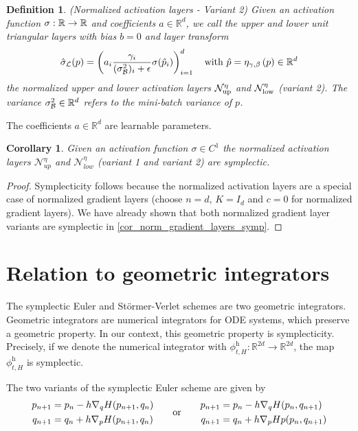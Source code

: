 \documentclass[twoside,a4paper]{article}
\newtheorem{definition}{Definition}
\newtheorem{corollary}{Corollary}
\begin{document}
\begin{definition}
	(Normalized activation layers - Variant 2)
	Given an activation function $\activation : \R \to \R$ and coefficients $a \in \mathbb{R}^d$, 
	we call the upper and lower unit triangular layers with bias $b=0$ and layer transform
	\begin{equation*}
		\layertf(p) = \lb a_i \frac{\gamma_i}{(\sigma^2_\mathcal{B})_i + \epsilon} 
		\activation(\hat{p}_i) \rb_{i=1}^d
		\quad \text{with } \hat{p} = \eta_{\gamma, \beta} \lb p \rb \in \R^d
	\end{equation*}
	the normalized upper and lower activation layers $\mathcal{N}_\up^\eta$ and $\mathcal{N}_\low^\eta$
	(variant 2).
	The variance $\sigma^2_\mathcal{B} \in \R^d$ refers to the mini-batch variance of $p$.
\end{definition}

The coefficients $a \in \mathbb{R}^d$ are learnable parameters.

\begin{corollary}
	Given an activation function $\sigma \in C^1$
	the normalized activation layers $\mathcal{N}^{\eta}_{up}$ and $\mathcal{N}^{\eta}_{low}$
	(variant 1 and variant 2) are symplectic.
\end{corollary}
\begin{proof}
	Symplecticity follows because the normalized activation layers are a special case
	of normalized gradient layers (choose $n=d$, $K=I_d$ and $c=0$ for normalized gradient layers). 
	We have already shown that both normalized gradient layer variants are symplectic in
	\cref{cor_norm_gradient_layers_symp}.
\end{proof}


\section{Relation to geometric integrators}

The symplectic Euler and Störmer-Verlet schemes are two geometric integrators. Geometric integrators
are numerical integrators for ODE systems, which preserve a geometric property. In our context,
this geometric property is symplecticity. Precisely, if we denote the numerical integrator with
$\phi^{\text{h}}_{t,H} : \mathbb{R}^{2d} \to \mathbb{R}^{2d}$, the map $\phi^{\text{h}}_{t,H}$ is
symplectic.

The two variants of the symplectic Euler scheme are given by
\begin{equation*}
	\begin{split}
			p_{n+1} &= p_n - h \grad[q]{H} (p_{n+1}, q_n) \\
			q_{n+1} &= q_n + h \grad[p]{H}(p_{n+1}, q_n)	
	\end{split}
	\quad\quad \text{or} \quad\quad
	\begin{split}
			p_{n+1} &= p_n - h \grad[q]{H}(p_n, q_{n+1}) \\
			q_{n+1} &= q_n + h \grad[p]{H}{p}(p_n, q_{n+1})	
	\end{split}
\end{equation*}
\end{document}
